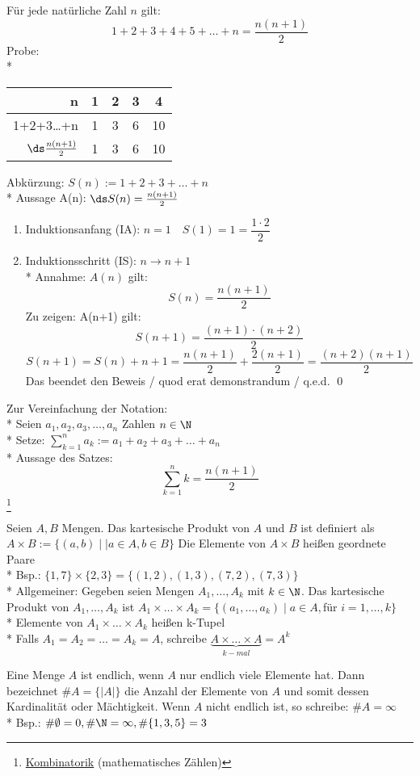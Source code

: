 Für jede natürliche Zahl $n$ gilt:
$$1+2+3+4+5+…+n=\frac{n(n+1)}{2}$$
Probe:\\*
\begin{tabular}{r|c|c|c|c}
n & 1 & 2 & 3 & 4\\* \hline\hline
1+2+3…+n & 1 & 3 & 6 & 10\\* \hline
$\ds \frac{n(n+1)}{2}$ & 1 & 3 & 6 & 10\\*
\end{tabular}
Abkürzung: $S(n) := 1+2+3+…+n$\\*
Aussage A(n): $\ds S(n) = \frac{n(n+1)}{2}$
\begin{enumerate}
\item {Induktionsanfang (IA): $n=1\quad S(1) = 1 = \dfrac{1·2}{2}$\ok}
\item {Induktionsschritt (IS): $n → n+1$\\*
Annahme: $A(n)$ gilt: $$ S(n) = \frac{n(n+1)}{2}$$
Zu zeigen: A(n+1) gilt: $$S(n+1)=\frac{(n+1)·(n+2)}{2}$$
$$S(n+1)=S(n)+n+1=\frac{n(n+1)}{2}+\frac{2(n+1)}{2}=\frac{(n+2)(n+1)}{2}$$
Das beendet den Beweis / quod erat demonstrandum / q.e.d.} \qed
\end{enumerate}
%
Zur Vereinfachung der Notation:\\*
Seien $a_1,a_2,a_3,…,a_n$ Zahlen $n \in \N$\\*
Setze: $\sum_{k=1}^n a_k := a_1+a_2+a_3+…+a_n$\\*
Aussage des Satzes:
\[ \sum_{k=1}^n k = \frac{n(n+1)}{2}\]\footnote{\ul{Kombinatorik} (mathematisches Zählen)}

Seien $A, B$ Mengen. Das kartesische Produkt von $A$ und $B$ ist definiert als $A × B := \{(a,b)\mid |a\in A, b \in B\}$ Die Elemente von $A × B$ heißen geordnete Paare\\*
Bsp.: $\{1,7\}\times \{2,3\}=\{(1,2),(1,3),(7,2),(7,3)\}$\\*
Allgemeiner: Gegeben seien Mengen
$A_1,…,A_k$ mit $k \in \N$. Das kartesische Produkt von $A_1,…,A_k$ ist $A_1\times …\times A_k = \{(a_1,…,a_k)\mid a\in A, $für $i=1,…,k\}$\\*
Elemente von $A_1 × … × A_k$ heißen k-Tupel\\*
Falls $A_1=A_2=…=A_k=A$, schreibe $\underbrace{A×…×A}_{k-mal}=A^k$

Eine Menge $A$ ist endlich, wenn $A$ nur endlich viele Elemente hat. Dann bezeichnet
$\#A = \{|A|\}$ die Anzahl der Elemente von $A$ und somit dessen Kardinalität
oder Mächtigkeit. Wenn $A$ nicht endlich ist, so schreibe: $\# A= \infty$\\*
Bsp.: $\#\emptyset = 0, \#\N=\infty, \# \{1,3,5\} = 3$

